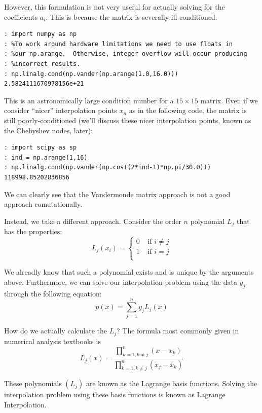However, this formulation is not very useful for actually solving for the coefficients $a_i$. This is because the matrix is severally ill-conditioned.

\begin{lstlisting}[style=python]
: import numpy as np
: %To work around hardware limitations we need to use floats in
: %our np.arange.  Otherwise, integer overflow will occur producing
: %incorrect results.
: np.linalg.cond(np.vander(np.arange(1.0,16.0)))
2.5824111670978156e+21
\end{lstlisting}

This is an astronomically large condition number for a $15 \times 15$ matrix. Even if we consider ``nicer'' interpolation points $x_n$ as in the following code, the matrix is still poorly-conditioned (we'll discuss these nicer interpolation points, known as the Chebyshev nodes, later):

\begin{lstlisting}[style=python]
: import scipy as sp
: ind = np.arange(1,16)
: np.linalg.cond(np.vander(np.cos((2*ind-1)*np.pi/30.0)))
118998.85202836856
\end{lstlisting}

We can clearly see that the Vandermonde matrix approach is not a good approach comutationally.

Instead, we take a different approach. Consider the order $n$ polynomial $L_j$ that has the properties:
\[
L_j(x_i) = \begin{cases} 0 &\mbox{ if } i \neq j\\ 1 &\mbox{ if } i =j \\ \end{cases}
\]

We alreadly know that such a polynomial exists and is unique by the arguments above. Furthermore, we can solve our interpolation problem using the data $y_j$ through the following equation:
\[
p(x) = \sum_{j=1}^n y_j L_j(x)
\]

How do we actually calculate the $L_j$? The formula most commonly given in numerical analysis textbooks is
\[
L_j(x) = \frac{\displaystyle\prod_{k=1, k \neq j}^n (x-x_k)}{\displaystyle\prod_{k=1, k \neq j}^n (x_j-x_k)}
\]

These polynomials $(L_j)$ are known as the Lagrange basis functions. Solving the interpolation problem using these basis functions is known as Lagrange Interpolation.

